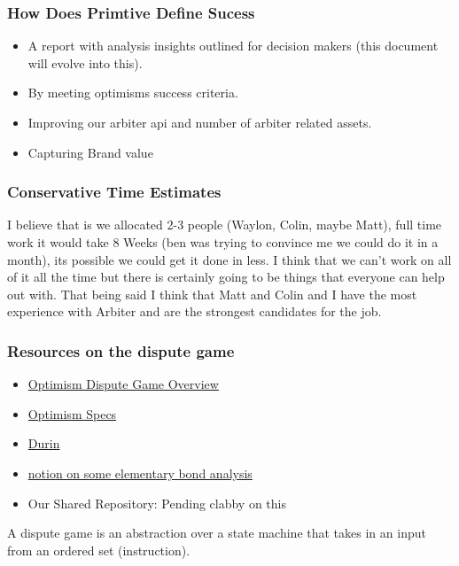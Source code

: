 \subsubsection{How Does Primtive Define Sucess}

\begin{itemize}
  \item A report with analysis insights outlined for decision makers (this document will evolve into this).
  \item By meeting optimisms success criteria.
  \item Improving our arbiter api and number of arbiter related assets.
  \item Capturing Brand value 
\end{itemize}

\subsubsection{Conservative Time Estimates}
I believe that is we allocated 2-3 people (Waylon, Colin, maybe Matt), full time work it would take 8 Weeks (ben was trying to convince me we could do it in a month), its possible we could get it done in less. 
I think that we can't work on all of it all the time but there is certainly going to be things that everyone can help out with.
That being said I think that Matt and Colin and I have the most experience with Arbiter and are the strongest candidates for the job.
\subsubsection{Resources on the dispute game}

\begin{itemize}
  \item \href{https://www.youtube.com/watch?v=nIN5sNc6nQM}{Optimism Dispute Game Overview}
  \item \href{https://github.com/ethereum-optimism/optimism/blob/develop/specs/fault-dispute-game.md}{Optimism Specs}
  \item \href{https://github.com/anton-rs/durin}{Durin}
  \item \href{https://www.notion.so/oplabs/Bondorama-886cd1cfefcc44649f3e16f47d9a4477?pvs=4}{notion on some elementary bond analysis}
  \item Our Shared Repository: Pending clabby on this
\end{itemize}

A dispute game is an abstraction over a state machine that takes in an input from an ordered set (instruction).

